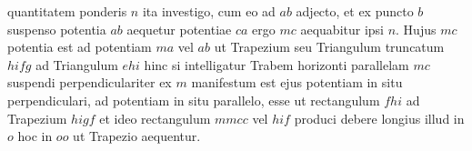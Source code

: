 quantitatem ponderis\protect{} $n$ ita investigo, cum eo ad $ab$ adjecto, et ex puncto $b$ suspenso potentia $ab$ aequetur potentiae $ca$ ergo $mc$ aequabitur ipsi $n$.
Hujus $mc$ potentia est ad potentiam $ma$ vel $ab$ ut Trapezium seu Triangulum truncatum $hifg$ ad Triangulum $ehi$ hinc si intelligatur Trabem horizonti parallelam $mc$ suspendi perpendiculariter ex $m$  manifestum est ejus potentiam in situ perpendiculari, ad potentiam in situ parallelo, esse ut rectangulum $fhi$ ad Trapezium $higf$ et ideo rectangulum $mmcc$ vel $hif$ produci debere longius illud  in $o$ hoc in $oo$ ut Trapezio\protect{} aequentur.\\
